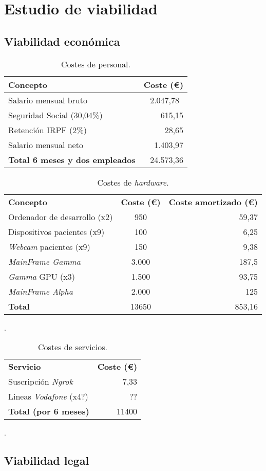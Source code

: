 \section{Estudio de viabilidad}

\subsection{Viabilidad económica}

\begin{table}\centering
	\begin{tabular}[]{@{}l r@{}}
		\toprule
		\textbf{Concepto} & \textbf{Coste (\euro{})} \\
		\midrule
		Salario mensual bruto & 2.047,78~\cite{salariales} \\
		Seguridad Social (30,04\%) & 615,15 \\
		Retención IRPF (2\%) & 28,65 \\
		Salario mensual neto & 1.403,97 \\\hubu
		\textbf{Total 6 meses y dos empleados} &  24.573,36 \\
		\bottomrule
	\end{tabular}
	\caption{Costes de personal.}
	\label{tab:costes_personal}
\end{table}

\begin{table}
	\centering
	\begin{tabular}[]{@{}l c r@{}}
		\toprule
		\textbf{Concepto} & \textbf{Coste (\euro{})} & \textbf{Coste amortizado (\euro{})} \\
		\otoprule
		Ordenador de desarrollo (x2) & 950 &  59,37\\
		Dispositivos pacientes (x9) & 100 & 6,25\\
		\textit{Webcam} pacientes (x9) & 150 &9,38\\
		\textit{MainFrame Gamma}  & 3.000 & 187,5 \\ 
		\textit{Gamma} GPU (x3) & 1.500 &  93,75\\
		\textit{MainFrame Alpha}  & 2.000 & 125 \\\hubu
		\textbf{Total} & 13650 & 853,16\\
		\bottomrule
	\end{tabular}
	\caption{Costes de \textit{hardware}.}
	\label{tab:costes_hardware}.
\end{table}

\begin{table}
	\centering
	\begin{tabular}[]{@{}l r@{}}
		\toprule
		\textbf{Servicio} & \textbf{Coste (\euro{})}\\
		\otoprule
 		Suscripción \textit{Ngrok}  & 7,33 \\
		Lineas \textit{Vodafone} (x4?) & ?? \\\hubu
		\textbf{Total (por 6 meses)} & 11400\\
		\bottomrule
	\end{tabular}
	\caption{Costes de servicios.}
	\label{tab:costes_servicios}.
\end{table}

\subsection{Viabilidad legal}


